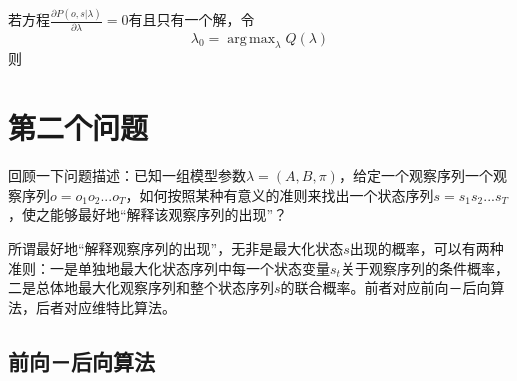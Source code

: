 \documentclass[11pt,a4paper]{article}
\DeclareMathOperator*{\argmax}{arg\,max}
\numberwithin{equation}{section}
\begin{document}
\begin{proposition}\label{converge condition proof}
若方程$ \frac{\partial P(o, s | \lambda)}{\partial \lambda} = 0 $有且只有一个解，令
\begin{equation}
\lambda_0 = \argmax_{\lambda} Q(\lambda)
\end{equation}
则
\end{proposition}

\section{第二个问题}

回顾一下问题描述：已知一组模型参数$ \lambda = (A, B, \pi) $，给定一个观察序列一个观察序列$ o = o_1 o_2 ... o_T $，如何按照某种有意义的准则来找出一个状态序列$ s = s_1 s_2 ... s_T $，使之能够最好地“解释该观察序列的出现”？

所谓最好地“解释观察序列的出现”，无非是最大化状态$ s $出现的概率，可以有两种准则：一是单独地最大化状态序列中每一个状态变量$ s_t $关于观察序列的条件概率，二是总体地最大化观察序列和整个状态序列$ s $的联合概率。前者对应前向－后向算法，后者对应维特比算法。

\subsection{前向－后向算法}
\end{document}
